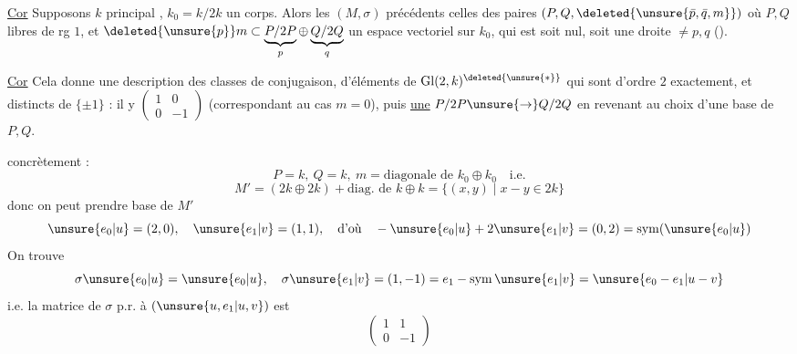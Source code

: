 \uline{Cor} Supposons $k$ principal , $k_0=k/2k$ un corps.
Alors les $(M,\sigma)$  précédents
 celles des paires $(P,Q,\deleted{\unsure{\bar p,\bar q,m}})$ où $P,Q$ libres de rg $1$,
et $\deleted{\unsure{p}}m\subset\underbrace{P/2P}_{p}\oplus\underbrace{Q/2Q}_{q}$ un espace vectoriel sur $k_0$,
qui est soit nul, soit une droite $\ne p,q$ ().

\uline{Cor} Cela donne une description des classes de conjugaison,
d'éléments de $\mathrm{Gl}(2,k)^{\deleted{\unsure{*}}}$ qui sont d'ordre $2$ exactement, et
distincts de $\{\pm1\}$ : il y  
$\begin{pmatrix}1&0\\0&-1\end{pmatrix}$ (correspondant au
cas $m=0$), puis \uline{une} 
 $P/2P\unsure{\to}Q/2Q$ en revenant au choix d'une base de $P,Q$.

 concrètement :
\[
P=k,\ Q=k,\ m=\text{diagonale de }k_0\oplus k_0\quad\text{i.e.}
\]
\[
M'=(2k\oplus2k)+\text{diag. de }k\oplus k
=\{(x,y)\mid x-y\in2k\}
\]
donc on peut prendre base de $M'$
\[
\unsure{e_0|u}=(2,0),\quad\unsure{e_1|v}=(1,1),\quad
\text{d'où}\quad-\unsure{e_0|u}+2\unsure{e_1|v}=(0,2)=\operatorname{sym}(\unsure{e_0|u})
\]
On trouve
\[
\sigma\unsure{e_0|u}=\unsure{e_0|u},\quad
\sigma\unsure{e_1|v}=(1,-1)=e_1-\operatorname{sym}\unsure{e_1|v}=\unsure{e_0-e_1|u-v}
\]
i.e. la matrice de $\sigma$ p.r. à $(\unsure{u,e_1|u,v})$ est
\[\begin{pmatrix}1&1\\0&-1\end{pmatrix}\]

